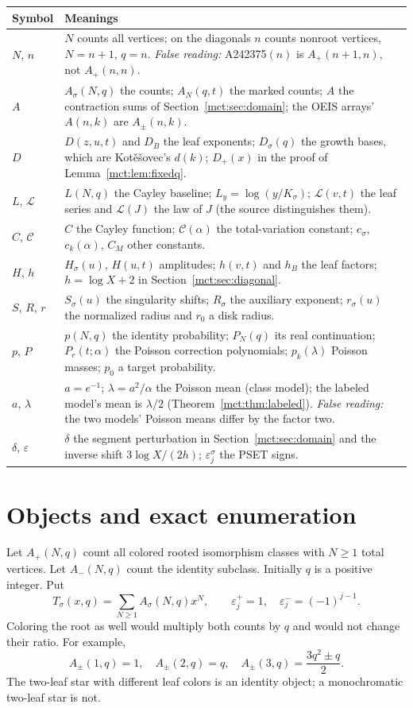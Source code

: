 \documentclass[11pt]{article}
\theoremstyle{definition}
\newcommand{\Cay}{C}
\newcommand{\eps}{\varepsilon}
\begin{document}
\noindent\begin{tabular}{@{}>{\raggedright\arraybackslash}p{0.8in}>{\raggedright\arraybackslash}p{5.4in}@{}}
\toprule
Symbol & Meanings\\
\midrule
$N$, $n$ & $N$ counts all vertices; on the diagonals $n$ counts nonroot vertices, $N=n+1$, $q=n$. \emph{False reading:} A242375$(n)$ is $A_+(n+1,n)$, not $A_+(n,n)$.\\
$A$ & $A_\sigma(N,q)$ the counts; $A_N(q,t)$ the marked counts; $A$ the contraction sums of Section~\ref{mct:sec:domain}; the OEIS arrays' $A(n,k)$ are $A_\pm(n,k)$.\\
$D$ & $D(z,u,t)$ and $D_B$ the leaf exponents; $D_\sigma(q)$ the growth bases, which are Kot\v{e}\v{s}ovec's $d(k)$; $D_+(x)$ in the proof of Lemma~\ref{mct:lem:fixedq}.\\
$L$, $\mathcal L$ & $L(N,q)$ the Cayley baseline; $L_y=\log(y/K_\sigma)$; $\mathcal L(v,t)$ the leaf series and $\mathcal L(J)$ the law of $J$ (the source distinguishes them).\\
$C$, $\mathcal C$ & $\Cay$ the Cayley function; $\mathcal C(\alpha)$ the total-variation constant; $c_\sigma$, $c_k(\alpha)$, $C_M$ other constants.\\
$H$, $h$ & $H_\sigma(u)$, $H(u,t)$ amplitudes; $h(v,t)$ and $h_B$ the leaf factors; $h=\log X+2$ in Section~\ref{mct:sec:diagonal}.\\
$S$, $R$, $r$ & $S_\sigma(u)$ the singularity shifts; $R_\sigma$ the auxiliary exponent; $r_\sigma(u)$ the normalized radius and $r_0$ a disk radius.\\
$p$, $P$ & $p(N,q)$ the identity probability; $P_N(q)$ its real continuation; $P_r(t;\alpha)$ the Poisson correction polynomials; $p_k(\lambda)$ Poisson masses; $p_0$ a target probability.\\
$a$, $\lambda$ & $a=e^{-1}$; $\lambda=a^2/\alpha$ the Poisson mean (class model); the labeled model's mean is $\lambda/2$ (Theorem~\ref{mct:thm:labeled}). \emph{False reading:} the two models' Poisson means differ by the factor two.\\
$\delta$, $\eps$ & $\delta$ the segment perturbation in Section~\ref{mct:sec:domain} and the inverse shift $3\log X/(2h)$; $\eps^\sigma_j$ the PSET signs.\\
\bottomrule
\end{tabular}
\endgroup

\section{Objects and exact enumeration}\label{mct:sec:exact}
Let $A_+(N,q)$ count all colored rooted isomorphism classes with $N\ge1$ total vertices. Let $A_-(N,q)$ count the identity subclass. Initially $q$ is a positive integer. Put
\[
 T_\sigma(x,q)=\sum_{N\ge1}A_\sigma(N,q)x^N,
 \qquad \eps_j^+=1,\quad \eps_j^-=(-1)^{j-1}.
\]
Coloring the root as well would multiply both counts by $q$ and would not change their ratio. For example,
\[
 A_\pm(1,q)=1,\quad A_\pm(2,q)=q,\quad
 A_\pm(3,q)=\frac{3q^2\pm q}{2}.
\]
The two-leaf star with different leaf colors is an identity object; a monochromatic two-leaf star is not.
\end{document}
